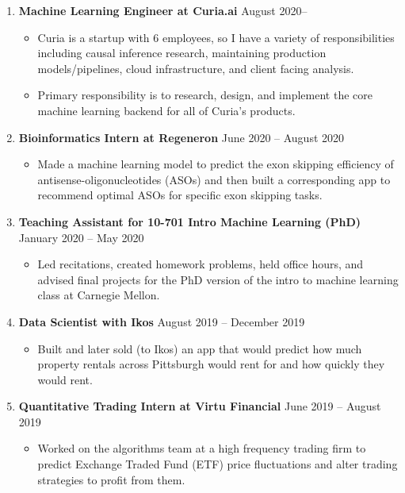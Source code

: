 \documentclass[letterpaper,11pt]{article}
\newcommand{\resitem}[1]{\item #1 \vspace{-2pt}}
\begin{document}
\vspace{-6pt}
\begin{enumerate}[leftmargin=10pt]
	\item[] \textbf{Machine Learning Engineer at \textcolor{myGreen}{Curia.ai}} \cftdotfill{\cftdotsep} August 2020--\\
	\vspace{-4pt}	
	\begin{itemize}
		\resitem{Curia is a startup with 6 employees, so I have a variety of responsibilities including causal inference research, maintaining production models/pipelines, cloud infrastructure, and client facing analysis.}
		\resitem{Primary responsibility is to research, design, and implement the core machine learning backend for all of Curia's products.}
	\end{itemize}
	 
	\item[] \textbf{Bioinformatics Intern at \textcolor{myGreen}{Regeneron}} \cftdotfill{\cftdotsep} June 2020 -- August 2020\\
	\vspace{-4pt}	
	\begin{itemize}
		\resitem{Made a machine learning model to predict the exon skipping efficiency of antisense-oligonucleotides (ASOs) and then built a corresponding app to recommend optimal ASOs for specific exon skipping tasks.}	
	\end{itemize}

	\item[] \textbf{Teaching Assistant for \textcolor{myGreen}{10-701 Intro Machine Learning (PhD)}} \cftdotfill{\cftdotsep} January 2020 -- May 2020\\
	\vspace{-4pt}
	\begin{itemize}
		\resitem{Led recitations, created homework problems, held office hours, and advised final projects for the PhD version of the intro to machine learning class at Carnegie Mellon.}
	\end{itemize}

	\item[] \textbf{Data Scientist with \textcolor{myGreen}{Ikos}} \cftdotfill{\cftdotsep} August 2019 -- December 2019\\
	\vspace{-4pt}	
	\begin{itemize}
		\resitem{Built and later sold (to Ikos) an app that would predict how much property rentals across Pittsburgh would rent for and how quickly they would rent.}	
	\end{itemize}
	
	\item[] \textbf{Quantitative Trading Intern at \textcolor{myGreen}{Virtu Financial}} \cftdotfill{\cftdotsep} June 2019 -- August 2019\\
	\vspace{-4pt}
	\begin{itemize}
		\resitem{Worked on the algorithms team at a high frequency trading firm to predict Exchange Traded Fund (ETF) price fluctuations and alter trading strategies to profit from them.}
	\end{itemize}
\end{enumerate}
\end{document}
